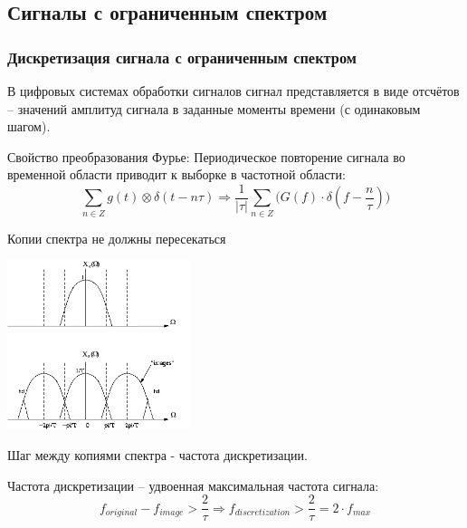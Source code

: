 \documentclass[utf8]{beamer}
\begin{document}
\subsection{Сигналы с ограниченным спектром}
\begin{frame}
\frametitle{Дискретизация сигнала с ограниченным спектром}
В цифровых системах обработки сигналов сигнал представляется в виде отсчётов -- значений амплитуд сигнала в заданные моменты времени (с одинаковым шагом).

Свойство преобразования Фурье: Периодическое повторение сигнала во временной области приводит к выборке в частотной области:
$$
\sum_{n\in Z} g(t) \otimes \delta (t - n\tau) \Rightarrow \frac{1}{|\tau|}\sum_{n \in Z}\Bigg(G(f)\cdot \delta(f - \frac{n}{\tau})\Bigg)
$$
\end{frame}
\begin{frame}
Копии спектра не должны пересекаться
\begin{center}
\includegraphics[width=0.4\textwidth]{pic/aliasing.png}
\end{center}
Шаг между копиями спектра - частота дискретизации.

Частота дискретизации -- удвоенная максимальная частота сигнала:
$$
f_{original} - f_{image} > \frac{2}{\tau} \Rightarrow f_{discretization} > \frac{2}{\tau}  = 2\cdot f_{max}
$$
\end{frame}
\end{document}
